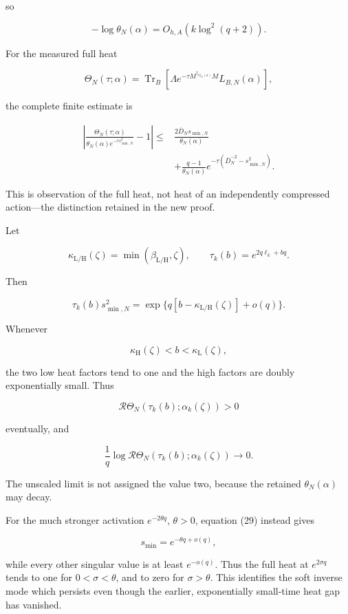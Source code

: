 \documentclass[11pt]{article}
\begin{document}
so

\[
-\log\theta_N(\alpha)=O_{h,A}(k\log^2(q+2)).
\tag{32}
\]

For the measured full heat

\[
\Theta_N(\tau;\alpha)
=
\operatorname{Tr}_B
\left[
\Lambda e^{-\tau M^{\dagger_{G_N(\alpha)}}M}
L_{B,N}(\alpha)
\right],
\]

the complete finite estimate is

\[
\boxed{
\begin{aligned}
\left|
\frac{\Theta_N(\tau;\alpha)}
{\theta_N(\alpha)e^{-\tau s_{\min,N}^2}}-1
\right|
\le{}&
\frac{2\overline D_Ns_{\min,N}}{\theta_N(\alpha)}\\
&+\frac{q-1}{\theta_N(\alpha)}
e^{-\tau(\overline D_N^{-2}-s_{\min,N}^2)}.
\end{aligned}}
\tag{33}
\]

This is observation of the full heat, not heat of an independently compressed action---the distinction retained in the new proof.

Let

\[
\kappa_{\mathrm L/\mathrm H}(\zeta)
=\min(\beta_{\mathrm L/\mathrm H},\zeta),
\qquad
\tau_k(b)=e^{2q\ell_k+bq}.
\]

Then

\[
\tau_k(b)s_{\min,N}^2
=
\exp\{q[b-\kappa_{\mathrm L/\mathrm H}(\zeta)]+o(q)\}.
\]

Whenever

\[
\kappa_{\mathrm H}(\zeta)<b<\kappa_{\mathrm L}(\zeta),
\]

the two low heat factors tend to one and the high factors are doubly exponentially small. Thus

\[
\boxed{
\mathcal R\Theta_N(\tau_k(b);\alpha_k(\zeta))>0
}
\]

eventually, and

\[
\boxed{
\frac1q\log
\mathcal R\Theta_N(\tau_k(b);\alpha_k(\zeta))
\longrightarrow0.
}
\tag{34}
\]

The unscaled limit is not assigned the value two, because the retained \(\theta_N(\alpha)\) may decay.

For the much stronger activation \(e^{-2\theta q}\), \(\theta>0\), equation (29) instead gives

\[
s_{\min}=e^{-\theta q+o(q)},
\]

while every other singular value is at least \(e^{-o(q)}\). Thus the full heat at \(e^{2\sigma q}\) tends to one for \(0<\sigma<\theta\), and to zero for \(\sigma>\theta\). This identifies the soft inverse mode which persists even though the earlier, exponentially small-time heat gap has vanished.
\end{document}
